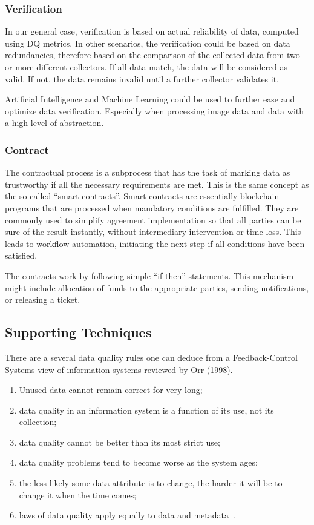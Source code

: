 \subsubsection{Verification}

In our general case, verification is based on actual reliability of data, computed using DQ metrics.
In other scenarios, the verification could be based on data redundancies, therefore based on the comparison of the collected data from two or more different collectors.
If all data match, the data will be considered as valid.
If not, the data remains invalid until a further collector validates it.

Artificial Intelligence and Machine Learning could be used to further ease and optimize data verification.
Especially when processing image data and data with a high level of abstraction.

\subsubsection{Contract}

The contractual process is a subprocess that has the task of marking data as trustworthy if all the necessary requirements are met.
This is the same concept as the so-called \enquote{smart contracts}.
Smart contracts are essentially blockchain programs that are processed when mandatory conditions are fulfilled.
They are commonly used to simplify agreement implementation so that all parties can be sure of the result instantly, without intermediary intervention or time loss.
This leads to workflow automation, initiating the next step if all conditions have been satisfied.

The contracts work by following simple \enquote{if-then} statements.
This mechanism might include allocation of funds to the appropriate parties, sending notifications, or releasing a ticket.

\subsection{Supporting Techniques}

There are a several data quality rules one can deduce from a Feedback-Control Systems view of information systems reviewed by Orr (1998).

\begin{enumerate}
    \item Unused data cannot remain correct for very long;
    \item data quality in an information system is a function of its use, not its collection;
    \item data quality cannot be better than its most strict use;
    \item data quality problems tend to become worse as the system ages;
    \item the less likely some data attribute is to change, the harder it will be to change it when the time comes;
    \item laws of data quality apply equally to data and metadata~\cite{orr1998}.
\end{enumerate}

